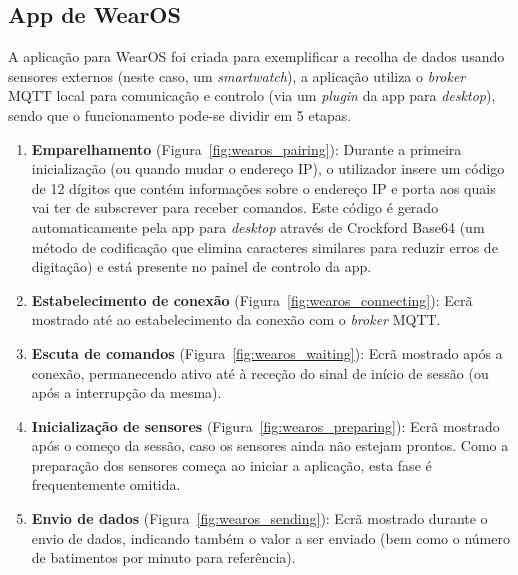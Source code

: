 \subsection{App de WearOS}

A aplicação para WearOS foi criada para exemplificar a recolha de dados usando sensores externos (neste caso, um \textit{smartwatch}), a aplicação utiliza o \textit{broker} \ac{MQTT} local para comunicação e controlo (via um \textit{plugin} da app para \textit{desktop}), sendo que o funcionamento pode-se dividir em 5 etapas.
\begin{enumerate}
    \item \textbf{Emparelhamento} (Figura~\ref{fig:wearos_pairing}): Durante a primeira inicialização (ou quando mudar o endereço IP), o utilizador insere um código de 12 dígitos que contém informações sobre o endereço IP e porta aos quais vai ter de subscrever para receber comandos. Este código é gerado automaticamente pela app para \textit{desktop} através de Crockford Base64 (um método de codificação que elimina caracteres similares para reduzir erros de digitação) e está presente no painel de controlo da app.
    \item \textbf{Estabelecimento de conexão} (Figura~\ref{fig:wearos_connecting}): Ecrã mostrado até ao estabelecimento da conexão com o \textit{broker} MQTT.
    \item \textbf{Escuta de comandos} (Figura~\ref{fig:wearos_waiting}): Ecrã mostrado após a conexão, permanecendo ativo até à receção do sinal de início de sessão (ou após a interrupção da mesma).
    \item \textbf{Inicialização de sensores} (Figura~\ref{fig:wearos_preparing}): Ecrã mostrado após o começo da sessão, caso os sensores ainda não estejam prontos. Como a preparação dos sensores começa ao iniciar a aplicação, esta fase é frequentemente omitida.
    \item \textbf{Envio de dados} (Figura~\ref{fig:wearos_sending}): Ecrã mostrado durante o envio de dados, indicando também o valor a ser enviado (bem como o número de batimentos por minuto para referência). 
\end{enumerate}

